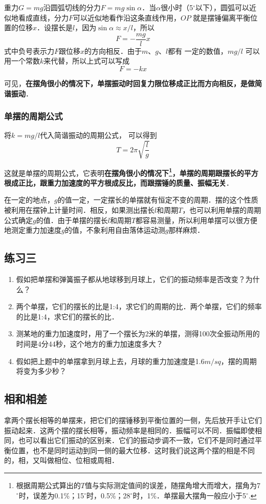 重力$G=mg$沿圆弧切线的分力$F=mg\sin\alpha$．当$\alpha$很小时（5$^\circ$以下），圆弧可以近似地看成直线，分力$F$可以近似地看作沿这条直线作用，$OP$ 就是摆锤偏离平衡位置的位移$x$．设摆长是$l$，因为$\sin\alpha\approx x/l$，所以
\[F=-\frac{mg}{l}x\]
式中负号表示力$F$跟位移$x$的方向相反．由于$m$、$g$、$l$都有
一定的数值，$mg/l$
可以用一个常数$k$来代替，所以上式可以写成
\[F=-kx\]

可见，\textbf{在摆角很小的情况下，单摆振动时回复力限位移成正比而方向相反，是做简谐振动}．

\subsubsection{单摆的周期公式}

将$k=mg/l$代入简谐振动的周期公式，
可以得到
\[T=2\pi\sqrt{\frac{l}{g}}\]

这就是单摆的周期公式，它表明\textbf{在摆角很小的情况下\footnote{根据周期公式算出的$T$值与实际测定值间的误差，随摆角增大而增大，摆角为7$^\circ$时，误差为0.1\%；15$^\circ$时，0.5\%；28$^\circ$时，1\%．单摆最大摆角一般应小于5$^\circ$.}，单摆的周期跟摆长的平方根成正比，跟重力加速度的平方根成反比，而跟摆锤的质量、振幅无关}．

在一定的地点，$g$的值一定，一定摆长的单摆就有恒定不变的周期．摆的这个性质被利用在摆钟上计量时间．相反，如果测出摆长$l$和周期$T$，也可以利用单摆的周期公式确定$g$的值．由于单摆的摆长$l$和周期$T$都容易测量，所以利用单摆可以很方便地测定重力加速度$g$的值，不象利用自由落体运动测$g$那样麻烦．

\subsection*{练习三}
\begin{enumerate}
    \item 假如把单摆和弹簧振子都从地球移到月球上，它们的振动频率是否改变？为什么？
    \item 两个单摆，它们的摆长的比是1:4，求它们的周期的比．两个单摆，它们的频率的比是1:4，求它们的摆长的比．
    \item 测某地的重力加速度时，用了一个摆长为2米的单摆，测得100次全振动所用的时间是4分44秒，这个地方的重力加速度多大？
    \item 假如把上题中的单摆拿到月球上去，月球的重力加速度是1.6$\si{m/s}q$，摆的周期将变为多少秒？
\end{enumerate}

\subsection{相和相差}
拿两个摆长相等的单摆来，把它们的摆锤移到平衡位置的一侧，先后放开手让它们振动起来．这两个摆的摆长相等，振动频率是相同的．振幅可以不同．振幅即使相同，也可以看出它们振动的区别来．它们的振动步调不一致，它们不是同时通过平衡位置，也不是同时运动到同一侧的最大位移．这时我们说这两个摆的相是不同的，相，又叫做相位、位相或周相．

